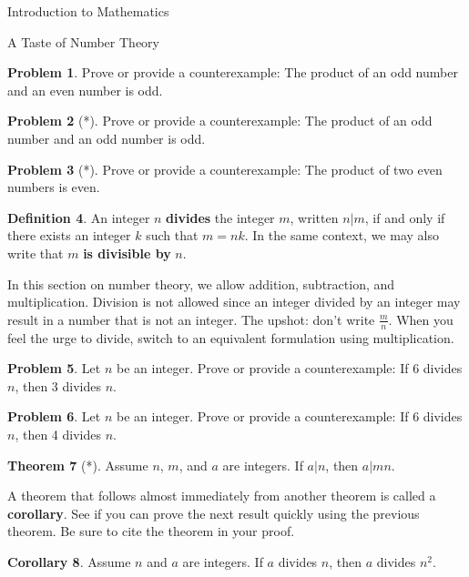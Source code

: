 \documentclass[11pt]{article}
\theoremstyle{definition}
\newtheorem{theorem}{Theorem}[section]
\newtheorem{corollary}[theorem]{Corollary}
\newtheorem{definition}[theorem]{Definition}
\newtheorem{problem}[theorem]{Problem}
\begin{document}
\begin{section}{Introduction to Mathematics}
\begin{subsection}{A Taste of Number Theory}
\begin{problem}
Prove or provide a counterexample: The product of an odd number and an even number is odd.
\end{problem}

\begin{problem}[*]
Prove or provide a counterexample: The product of an odd number and an odd number is odd.
\end{problem}

\begin{problem}[*]
Prove or provide a counterexample: The product of two even numbers is even.
\end{problem}

\begin{definition}
An integer $n$ \textbf{divides} the integer $m$, written $n|m$, if and only if there exists an integer $k$ such that $m=nk$. In the same context, we may also write that $m$ \textbf{is divisible by} $n$.
\end{definition}

In this section on number theory, we allow addition, subtraction, and multiplication.  Division is not allowed since an integer divided by an integer may result in a number that is not an integer. The upshot: don't write $\frac{m}{n}$.  When you feel the urge to divide, switch to an equivalent formulation using multiplication.

\begin{problem}
Let $n$ be an integer.  Prove or provide a counterexample: If 6 divides $n$, then 3 divides $n$.\end{problem}

\begin{problem}
Let $n$ be an integer.  Prove or provide a counterexample: If 6 divides $n$, then 4 divides $n$.
\end{problem}

\begin{theorem}[*]
Assume $n$, $m$, and $a$ are integers.  If $a|n$, then $a|mn$.
\end{theorem}

A theorem that follows almost immediately from another theorem is called a \textbf{corollary}.  See if you can prove the next result quickly using the previous theorem.  Be sure to cite the theorem in your proof.

\begin{corollary}
Assume $n$ and $a$ are integers.  If $a$ divides $n$, then $a$ divides $n^2$.
\end{corollary}


\end{subsection}
\end{section}
\end{document}
